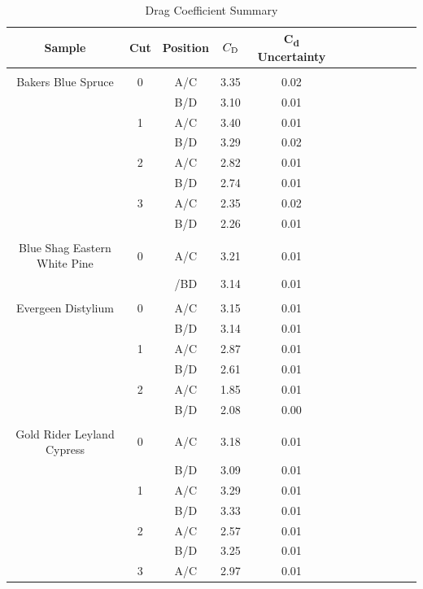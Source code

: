 \documentclass[12pt]{article}
\begin{document}
\begin{table}
\centering
\caption{Drag Coefficient Summary}
\label{tab:SumTable}
	\small
	\begin{tabular}{cccccccccccc}
			\hline
\textbf{Sample}	&	\textbf{Cut}	& 	\textbf{Position}	&	$C_{\rm D}$	&	\textbf{C\textsubscript{d} Uncertainty}	&	\\	\hline
		&		&			&				&						&	\\	
Bakers Blue Spruce	&	0	& 	A/C	&	3.35	&	0.02	&	\\	
	&		& 	B/D	&	3.10	&	0.01	&	\\	
	&	1	& 	A/C	&	3.40	&	0.01	&	\\	
	&		& 	B/D	&	3.29	&	0.02	&	\\	
	&	2	& 	A/C	&	2.82	&	0.01	&	\\	
	&		& 	B/D	&	2.74	&	0.01	&	\\	
	&	3	& 	A/C	&	2.35	&	0.02	&	\\	
	&		& 	B/D	&	2.26	&	0.01	&	\\	
	&		&		&		&		&	\\	
Blue Shag Eastern White Pine	&	0	& 	A/C	&	3.21	&	0.01	&	\\	
	&		& 	/BD	&	3.14	&	0.01	&	\\	
	&		&		&		&		&	\\	
Evergeen Distylium	&	0	& 	A/C	&	3.15	&	0.01	&	\\	
	&		& 	B/D	&	3.14	&	0.01	&	\\	
	&	1	& 	A/C	&	2.87	&	0.01	&	\\	
	&		& 	B/D	&	2.61	&	0.01	&	\\	
	&	2	& 	A/C	&	1.85	&	0.01	&	\\	
	&		& 	B/D	&	2.08	&	0.00	&	\\	
	&		&		&		&		&	\\	
Gold Rider Leyland Cypress	&	0	& 	A/C	&	3.18	&	0.01	&	\\	
	&		& 	B/D	&	3.09	&	0.01	&	\\	
	&	1	& 	A/C	&	3.29	&	0.01	&	\\	
	&		& 	B/D	&	3.33	&	0.01	&	\\	
	&	2	& 	A/C	&	2.57	&	0.01	&	\\	
	&		& 	B/D	&	3.25	&	0.01	&	\\	
	&	3	& 	A/C	&	2.97	&	0.01	&	\\	

\end{tabular}
\end{table}
\end{document}
